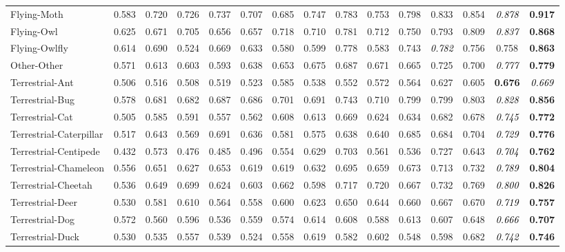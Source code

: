 \documentclass[10pt,journal,compsoc]{IEEEtran}
\newcommand{\Rev}[1]{\textcolor{black}{#1}}
\begin{document}
\begin{table*}[thp!]
\begin{tabular}{l | ccccc ccccc cccc}
Flying-Moth &0.583 &0.720 &0.726 &0.737 &0.707 &0.685 &0.747 &0.783 &0.753 &0.798 &0.833 &0.854 & \Rev{\textit{0.878}} &\textbf{0.917}\\
\rowcolor{mygray}
Flying-Owl &0.625 &0.671 &0.705 &0.656 &0.657 &0.718 &0.710 &0.781 &0.712 &0.750 &0.793 &0.809 & \Rev{\textit{0.837}} &\textbf{0.868}\\
Flying-Owlfly &0.614 &0.690 &0.524 &0.669 &0.633 &0.580 &0.599 &0.778 &0.583 &0.743 & \Rev{\textit{0.782}} &0.756 &0.758 &\textbf{0.863}\\
\rowcolor{mygray}
Other-Other &0.571 &0.613 &0.603 &0.593 &0.638 &0.653 &0.675 &0.687 &0.671 &0.665 &0.725 &0.700 & \Rev{\textit{0.777}} &\textbf{0.779}\\
Terrestrial-Ant &0.506 &0.516 &0.508 &0.519 &0.523 &0.585 &0.538 &0.552 &0.572 &0.564 &0.627 &0.605 &\textbf{0.676} & \Rev{\textit{0.669}}\\
\rowcolor{mygray}
Terrestrial-Bug &0.578 &0.681 &0.682 &0.687 &0.686 &0.701 &0.691 &0.743 &0.710 &0.799 &0.799 &0.803 & \Rev{\textit{0.828}} &\textbf{0.856}\\
Terrestrial-Cat &0.505 &0.585 &0.591 &0.557 &0.562 &0.608 &0.613 &0.669 &0.624 &0.634 &0.682 &0.678 & \Rev{\textit{0.745}} &\textbf{0.772}\\
\rowcolor{mygray}
Terrestrial-Caterpillar &0.517 &0.643 &0.569 &0.691 &0.636 &0.581 &0.575 &0.638 &0.640 &0.685 &0.684 &0.704 & \Rev{\textit{0.729}} &\textbf{0.776}\\
Terrestrial-Centipede &0.432 &0.573 &0.476 &0.485 &0.496 &0.554 &0.629 &0.703 &0.561 &0.536 &0.727 &0.643 & \Rev{\textit{0.704}} &\textbf{0.762}\\
\rowcolor{mygray}
Terrestrial-Chameleon &0.556 &0.651 &0.627 &0.653 &0.619 &0.619 &0.632 &0.695 &0.659 &0.673 &0.713 &0.732 & \Rev{\textit{0.789}} &\textbf{0.804}\\
Terrestrial-Cheetah &0.536 &0.649 &0.699 &0.624 &0.603 &0.662 &0.598 &0.717 &0.720 &0.667 &0.732 &0.769 & \Rev{\textit{0.800}} &\textbf{0.826}\\
\rowcolor{mygray}
Terrestrial-Deer &0.530 &0.581 &0.610 &0.564 &0.558 &0.600 &0.623 &0.650 &0.644 &0.660 &0.667 &0.670 & \Rev{\textit{0.719}} &\textbf{0.757}\\
Terrestrial-Dog &0.572 &0.560 &0.596 &0.536 &0.559 &0.574 &0.614 &0.608 &0.588 &0.613 &0.607 &0.648 & \Rev{\textit{0.666}} &\textbf{0.707}\\
\rowcolor{mygray}
Terrestrial-Duck &0.530 &0.535 &0.557 &0.539 &0.524 &0.558 &0.619 &0.582 &0.602 &0.548 &0.598 &0.682 & \Rev{\textit{0.742}} &\textbf{0.746}\\

\end{tabular}
\end{table*}
\end{document}
